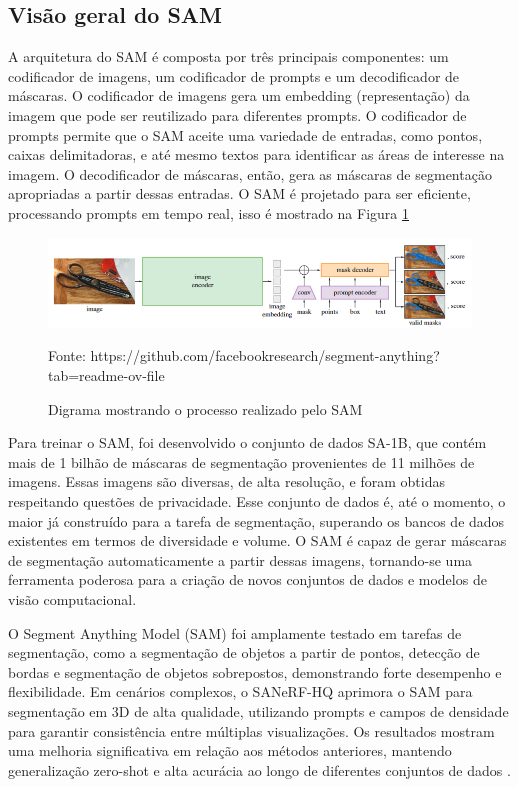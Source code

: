 \subsection{Visão geral do SAM}

A arquitetura do SAM é composta por três principais componentes: um codificador de imagens, um codificador de prompts e um decodificador de máscaras. O codificador de imagens gera um embedding (representação) da imagem que pode ser reutilizado para diferentes prompts. O codificador de prompts permite que o SAM aceite uma variedade de entradas, como pontos, caixas delimitadoras, e até mesmo textos para identificar as áreas de interesse na imagem. O decodificador de
máscaras, então, gera as máscaras de segmentação apropriadas a partir dessas entradas. O SAM é projetado para ser eficiente, processando prompts em tempo real, isso é mostrado na Figura \ref{fig:segmentanything}

\FloatBarrier
\begin{figure}[ht]
    \caption{Digrama mostrando o processo realizado pelo SAM}
    \centering
    \includegraphics[scale=0.5]{imagens/sam.png}

    Fonte: https://github.com/facebookresearch/segment-anything?tab=readme-ov-file 
    \label{fig:segmentanything}
\end{figure}
\FloatBarrier

Para treinar o SAM, foi desenvolvido o conjunto de dados SA-1B, que contém mais de 1 bilhão de máscaras de segmentação provenientes de 11 milhões de imagens. Essas imagens são diversas, de alta resolução, e foram obtidas respeitando
questões de privacidade. Esse conjunto de dados é, até o momento, o maior já construído para a tarefa de segmentação, superando os bancos de dados existentes em termos de diversidade e volume. O SAM é capaz de gerar máscaras de
segmentação automaticamente a partir dessas imagens, tornando-se uma ferramenta poderosa para a criação de novos conjuntos de dados e modelos de visão computacional.

O Segment Anything Model (SAM) foi amplamente testado em tarefas de segmentação, como a segmentação de objetos a partir de pontos, detecção de bordas e segmentação de objetos sobrepostos, demonstrando forte desempenho e flexibilidade. Em cenários complexos, o SANeRF-HQ aprimora o SAM para segmentação em 3D de alta qualidade, utilizando prompts e campos de densidade para garantir consistência entre múltiplas visualizações. Os resultados mostram uma melhoria significativa em relação aos métodos anteriores, mantendo generalização zero-shot e alta acurácia ao longo de diferentes conjuntos de dados \cite{liu2024sanerfhqsegmentnerfhigh}.

